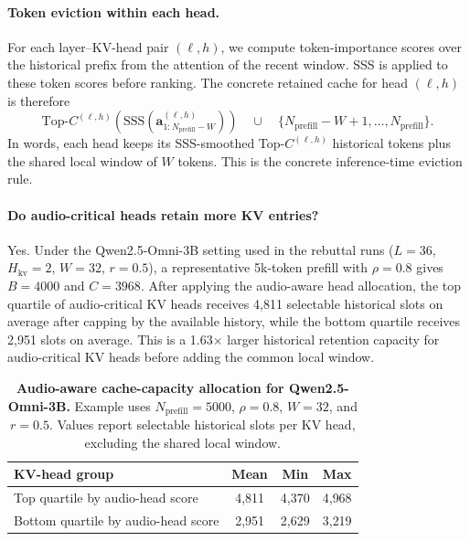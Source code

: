 \begin{answer}
    \paragraph{Token eviction within each head.}
    For each layer--KV-head pair $(\ell,h)$, we compute token-importance scores over the historical prefix from the attention of the recent window.
    SSS is applied to these token scores before ranking.
    The concrete retained cache for head $(\ell,h)$ is therefore
    \[
        \mathrm{Top}\text{-}C^{(\ell,h)}
        \left(
        \mathrm{SSS}(\mathbf{a}^{(\ell,h)}_{1:N_{\mathrm{prefill}}-W})
        \right)
        \quad \cup \quad
        \{N_{\mathrm{prefill}}-W+1,\ldots,N_{\mathrm{prefill}}\}.
    \]
    In words, each head keeps its SSS-smoothed Top-$C^{(\ell,h)}$ historical tokens plus the shared local window of $W$ tokens.
    This is the concrete inference-time eviction rule.

    \paragraph{Do audio-critical heads retain more KV entries?}
    Yes.
    Under the Qwen2.5-Omni-3B setting used in the rebuttal runs ($L=36$, $H_{\mathrm{kv}}=2$, $W=32$, $r=0.5$), a representative 5k-token prefill with $\rho=0.8$ gives $B=4000$ and $C=3968$.
    After applying the audio-aware head allocation, the top quartile of audio-critical KV heads receives 4{,}811 selectable historical slots on average after capping by the available history, while the bottom quartile receives 2{,}951 slots on average.
    This is a 1.63$\times$ larger historical retention capacity for audio-critical KV heads before adding the common local window.

    \begin{table}[t]
    \centering
    \small
    \setlength{\tabcolsep}{5pt}
    \caption{\textbf{Audio-aware cache-capacity allocation for Qwen2.5-Omni-3B.}
    Example uses $N_{\mathrm{prefill}}=5000$, $\rho=0.8$, $W=32$, and $r=0.5$.
    Values report selectable historical slots per KV head, excluding the shared local window.}
    \label{tab:rebuttal-ovzo-q3-head-capacity}
    \begin{tabular}{lccc}
    \toprule
    \textbf{KV-head group} & \textbf{Mean} & \textbf{Min} & \textbf{Max} \\
    \midrule
    Top quartile by audio-head score & 4{,}811 & 4{,}370 & 4{,}968 \\
    Bottom quartile by audio-head score & 2{,}951 & 2{,}629 & 3{,}219 \\
    \bottomrule
    \end{tabular}
    \end{table}


\end{answer}
